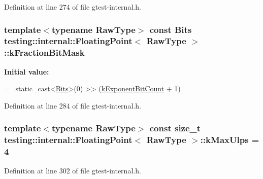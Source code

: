 Definition at line 274 of file gtest-\/internal.\+h.

\subsubsection[{\texorpdfstring{k\+Fraction\+Bit\+Mask}{kFractionBitMask}}]{\setlength{\rightskip}{0pt plus 5cm}template$<$typename Raw\+Type$>$ const {\bf Bits} {\bf testing\+::internal\+::\+Floating\+Point}$<$ Raw\+Type $>$\+::k\+Fraction\+Bit\+Mask\hspace{0.3cm}{\ttfamily [static]}}\hypertarget{classtesting_1_1internal_1_1_floating_point_a0ac75d4ffd24f14bca452abe8a718da1}{}\label{classtesting_1_1internal_1_1_floating_point_a0ac75d4ffd24f14bca452abe8a718da1}
{\bfseries Initial value\+:}
\begin{DoxyCode}
=
    ~static\_cast<\hyperlink{classtesting_1_1internal_1_1_floating_point_abf228bf6cd48f12c8b44c85b4971a731}{Bits}>(0) >> (\hyperlink{classtesting_1_1internal_1_1_floating_point_a1973d843c00781053d3073daa8a40119}{kExponentBitCount} + 1)
\end{DoxyCode}


Definition at line 284 of file gtest-\/internal.\+h.

\subsubsection[{\texorpdfstring{k\+Max\+Ulps}{kMaxUlps}}]{\setlength{\rightskip}{0pt plus 5cm}template$<$typename Raw\+Type$>$ const size\+\_\+t {\bf testing\+::internal\+::\+Floating\+Point}$<$ Raw\+Type $>$\+::k\+Max\+Ulps = 4\hspace{0.3cm}{\ttfamily [static]}}\hypertarget{classtesting_1_1internal_1_1_floating_point_aac498b3714d93f8e88cdc30e4c5935f6}{}\label{classtesting_1_1internal_1_1_floating_point_aac498b3714d93f8e88cdc30e4c5935f6}


Definition at line 302 of file gtest-\/internal.\+h.

